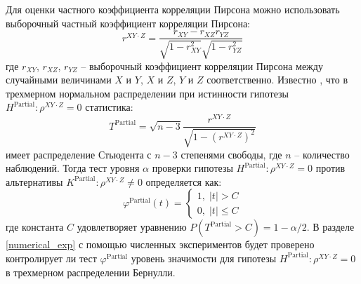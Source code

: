 Для оценки частного коэффициента корреляции Пирсона 
можно использовать
выборочный частный коэффициент корреляции Пирсона:
$$r^{XY\cdot Z}=\dfrac{r_{XY}-r_{XZ}r_{YZ}}{\sqrt{1-r_{XY}^2}\sqrt{1-r_{YZ}^2}}$$
где $r_{XY}$, $r_{XZ}$, $r_{YZ}$ -- выборочный коэффициент корреляции Пирсона
между случайными величинами $X$ и $Y$, $X$ и $Z$, $Y$ и $Z$
соответственно.  
Известно \cite{Anderson2003}, что 
в трехмерном нормальном распределении
при истинности гипотезы $H^{\text{Partial}}: \rho^{XY \cdot Z}=0$ статистика:
$$
T^{\text{Partial}}=\sqrt{n-3} \dfrac{r^{XY \cdot Z}}{\sqrt{1-(r^{XY \cdot Z})^2}}
$$
имеет распределение Стьюдента с $n-3$ степенями свободы, 
где $n$ -- количество наблюдений.
Тогда тест уровня $\alpha$ проверки гипотезы $H^{\text{Partial}}:\rho^{XY\cdot Z}=0$
против альтернативы $K^{\text{Partial}}:\rho^{XY\cdot Z}\neq 0$
определяется как:
$$
\varphi^{\text{Partial}}(t) = \begin{cases}
    1, \; |t|>C \\ 
    0, \; |t|\leq C
\end{cases}
$$
где константа $C$ удовлетворяет уравнению
$P(T^{\text{Partial}}>C)=1-\alpha/2$.
В разделе \ref{numerical_exp} с помощью численных экспериментов 
будет проверено контролирует ли тест $\varphi^{\text{Partial}}$
уровень значимости для гипотезы $H^{\text{Partial}}:\rho^{XY\cdot Z}=0$ в трехмерном распределении Бернулли.
